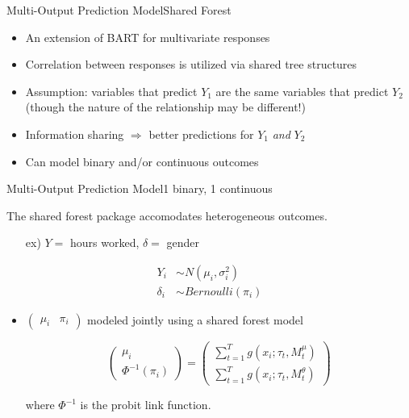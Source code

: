 \documentclass{beamer}
\begin{document}
\begin{frame}{Multi-Output Prediction Model}{Shared Forest}
\begin{itemize}
\item An extension of BART for multivariate responses
\item Correlation between responses is utilized via shared tree structures
\item Assumption: variables that predict $Y_1$ are the same variables that predict $Y_2$ (though the nature of the relationship may be different!)
\item Information sharing $\Rightarrow$ better predictions for $Y_1$ \textit{and} $Y_2$ 
\item Can model binary and/or continuous outcomes
\end{itemize}
\end{frame}



\begin{frame}{Multi-Output Prediction Model}{1 binary, 1 continuous }

The shared forest package accomodates heterogeneous outcomes. 
\begin{itemize}
\item[ex)] $Y = $ hours worked, $\delta = $ gender
\end{itemize}
\begin{align*}
Y_i &\sim N(\mu_i, \sigma^2_i) \\
\delta_i &\sim Bernoulli(\pi_i)
\end{align*}

\begin{itemize}
\item $\begin{pmatrix}\mu_i & \pi_i \end{pmatrix}$ modeled jointly using a shared forest model

$$\begin{pmatrix}\mu_i \\ \Phi^{-1}(\pi_i) \end{pmatrix} = 
\begin{pmatrix}\sum_{t=1}^T g(x_i ; \tau_t, M^{\mu}_t)\\%
\sum_{t=1}^T g(x_i ; \tau_t, M^{\theta}_t)%
\end{pmatrix} $$

where $\Phi^{-1}$ is the probit link function.
\end{itemize}
\end{frame}
\end{document}
